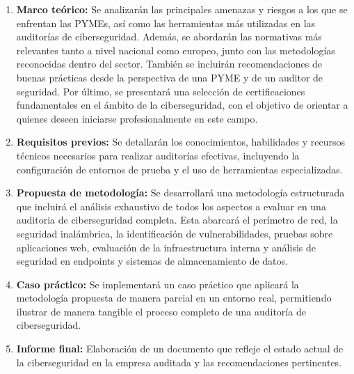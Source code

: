 \documentclass[a4paper, 10pt]{article}
\begin{document}
\begin{enumerate}
\item \textbf{Marco teórico:} Se analizarán las principales amenazas y riesgos a los que se enfrentan las PYMEs, así como las herramientas más utilizadas en las auditorías de ciberseguridad. Además, se abordarán las normativas más relevantes tanto a nivel nacional como europeo, junto con las metodologías reconocidas dentro del sector. También se incluirán recomendaciones de buenas prácticas desde la perspectiva de una PYME y de un auditor de seguridad. Por último, se presentará una selección de certificaciones fundamentales en el ámbito de la ciberseguridad, con el objetivo de orientar a quienes deseen iniciarse profesionalmente en este campo.    
    \item \textbf{Requisitos previos:} Se detallarán los conocimientos, habilidades y recursos técnicos necesarios para realizar auditorías efectivas, incluyendo la configuración de entornos de prueba y el uso de herramientas especializadas.
        
    \item \textbf{Propuesta de metodología:} Se desarrollará una metodología estructurada que incluirá el análisis exhaustivo de todos los aspectos a evaluar en una auditoria de ciberseguridad completa. Esta abarcará el perímetro de red, la seguridad inalámbrica, la identificación de vulnerabilidades, pruebas sobre aplicaciones web, evaluación de la infraestructura interna y análisis de seguridad en endpoints y sistemas de almacenamiento de datos.
    
    \item \textbf{Caso práctico:} Se implementará un caso práctico que aplicará la metodología propuesta de manera parcial en un entorno real, permitiendo ilustrar de manera tangible el proceso completo de una auditoría de ciberseguridad.
    
    \item \textbf{Informe final:} Elaboración de un documento que refleje el estado actual de la ciberseguridad en la empresa auditada y las recomendaciones pertinentes.
\end{enumerate}
\end{document}
